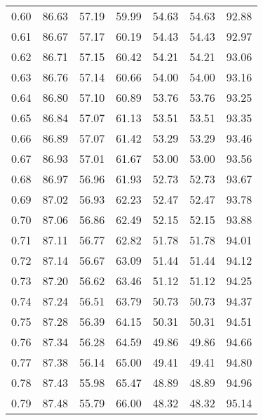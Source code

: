\begin{tabular}{|c|c|c|c|c|c|c|}
      0.60 &     86.63 &     57.19 &      59.99 &   54.63 &      54.63 &         92.88 \\
      0.61 &     86.67 &     57.17 &      60.19 &   54.43 &      54.43 &         92.97 \\
      0.62 &     86.71 &     57.15 &      60.42 &   54.21 &      54.21 &         93.06 \\
      0.63 &     86.76 &     57.14 &      60.66 &   54.00 &      54.00 &         93.16 \\
      0.64 &     86.80 &     57.10 &      60.89 &   53.76 &      53.76 &         93.25 \\
      0.65 &     86.84 &     57.07 &      61.13 &   53.51 &      53.51 &         93.35 \\
      0.66 &     86.89 &     57.07 &      61.42 &   53.29 &      53.29 &         93.46 \\
      0.67 &     86.93 &     57.01 &      61.67 &   53.00 &      53.00 &         93.56 \\
      0.68 &     86.97 &     56.96 &      61.93 &   52.73 &      52.73 &         93.67 \\
      0.69 &     87.02 &     56.93 &      62.23 &   52.47 &      52.47 &         93.78 \\
      0.70 &     87.06 &     56.86 &      62.49 &   52.15 &      52.15 &         93.88 \\
      0.71 &     87.11 &     56.77 &      62.82 &   51.78 &      51.78 &         94.01 \\
      0.72 &     87.14 &     56.67 &      63.09 &   51.44 &      51.44 &         94.12 \\
      0.73 &     87.20 &     56.62 &      63.46 &   51.12 &      51.12 &         94.25 \\
      0.74 &     87.24 &     56.51 &      63.79 &   50.73 &      50.73 &         94.37 \\
      0.75 &     87.28 &     56.39 &      64.15 &   50.31 &      50.31 &         94.51 \\
      0.76 &     87.34 &     56.28 &      64.59 &   49.86 &      49.86 &         94.66 \\
      0.77 &     87.38 &     56.14 &      65.00 &   49.41 &      49.41 &         94.80 \\
      0.78 &     87.43 &     55.98 &      65.47 &   48.89 &      48.89 &         94.96 \\
      0.79 &     87.48 &     55.79 &      66.00 &   48.32 &      48.32 &         95.14 \\

\end{tabular}
